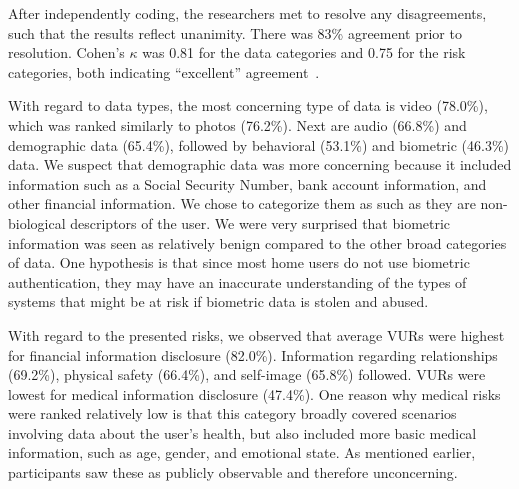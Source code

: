 \documentclass{sig-alternate-hotpets15}
\begin{document}
After independently coding, the researchers met to resolve any disagreements, such that the results reflect unanimity. There was  83\% agreement prior to resolution. Cohen's $\kappa$ was 0.81 for the data categories and 0.75 for the  risk categories, both indicating ``excellent'' agreement~\cite{Fleiss2003}. 

With regard to data types, the most concerning type of data is video (78.0\%), which was ranked similarly to photos (76.2\%). Next are audio (66.8\%) and demographic data (65.4\%), followed by behavioral (53.1\%) and biometric (46.3\%) data. We suspect that demographic data was more concerning because it included information such as a Social Security Number, bank account information, and other financial information. We chose to categorize them as such as they are non-biological descriptors of the user. We were very surprised that biometric information was seen as relatively benign compared to the other broad categories of data. One hypothesis is that since most home users do not use biometric authentication, they may have an inaccurate understanding of the types of systems that might be at risk if biometric data is stolen and abused.

With regard to the presented risks, we observed that average VURs were highest for financial information disclosure (82.0\%). Information regarding relationships (69.2\%), physical safety (66.4\%), and self-image (65.8\%) followed. VURs were lowest for medical information disclosure (47.4\%). One reason why medical risks were ranked relatively low is that this category broadly covered scenarios involving data about the user's health, but also included more basic medical information, such as age, gender, and emotional state. As mentioned earlier, participants saw these as publicly observable and therefore unconcerning.
\end{document}
